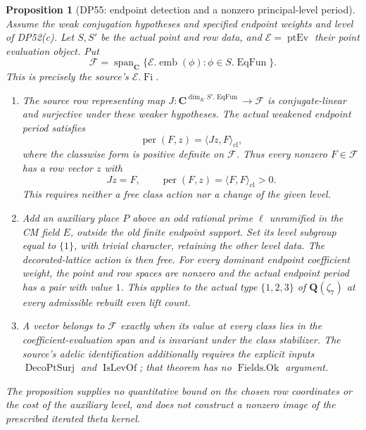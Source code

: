 \documentclass[11pt,a4paper]{article}
\newtheorem{proposition}[theorem]{Proposition}
\theoremstyle{definition}\newtheorem{remark}[theorem]{Remark}
\begin{document}
\begin{proposition}[DP55: endpoint detection and a nonzero principal-level period]\label{DP55}
Assume the weak conjugation hypotheses and specified endpoint weights and
level of DP52(c). Let $S,S'$ be the actual point and row data, and
$\mathcal E=\operatorname{ptEv}$ their point evaluation object. Put
\[
 \mathcal F=\operatorname{span}_{\mathbf C}
    \{\mathcal E.\operatorname{emb}(\phi):
                    \phi\in S.\operatorname{EqFun}\}.
\]
This is precisely the source's $\mathcal E.\operatorname{Fi}$.
\begin{enumerate}[label=(\alph*),leftmargin=*]
\item The source row representing map
$J:\mathbf C^{\dim_K S'.\operatorname{EqFun}}\to\mathcal F$
is conjugate-linear and surjective under these weaker hypotheses.
The actual weakened endpoint period satisfies
\[
 \operatorname{per}(F,z)=\langle Jz,F\rangle_{\mathrm{cl}},
\]
where the classwise form is positive definite on $\mathcal F$.
Thus every nonzero $F\in\mathcal F$ has a row vector $z$ with
\[
 Jz=F,\qquad
 \operatorname{per}(F,z)=\langle F,F\rangle_{\mathrm{cl}}>0.
\]
This requires neither a free class action nor a change of the given level.
\item Add an auxiliary place $P$ above an odd rational prime $\ell$
unramified in the CM field $E$, outside the old finite endpoint support.
Set its level subgroup equal to $\{1\}$, with trivial character, retaining
the other level data.
The decorated-lattice action is then free. For every dominant endpoint
coefficient weight, the point and row spaces are nonzero and the actual
endpoint period has a pair with value $1$.
This applies to the actual type $\{1,2,3\}$ of $\mathbf Q(\zeta_7)$
at every admissible rebuilt even lift count.
\item A vector belongs to $\mathcal F$ exactly when its value at every
class lies in the coefficient-evaluation span and is invariant under the
class stabilizer. The source's adelic identification additionally requires
the explicit inputs $\operatorname{DecoPtSurj}$ and
$\operatorname{IsLevOf}$; that theorem has no
$\operatorname{Fields.Ok}$ argument.
\end{enumerate}
The proposition supplies no quantitative bound on the chosen row
coordinates or the cost of the auxiliary level, and does not construct
a nonzero image of the prescribed iterated theta kernel.
\end{proposition}
\end{document}

